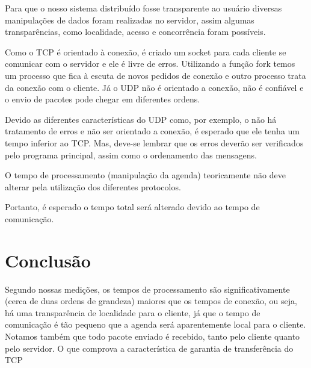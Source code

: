 \documentclass[10pt,a4paper]{article}
\begin{document}
Para que o nosso sistema distribuído fosse transparente ao usuário
diversas manipulações de dados foram realizadas no servidor, assim
algumas transparências, como localidade, acesso e concorrência foram
possíveis.

Como o TCP é orientado à conexão, é criado um socket para cada cliente
se comunicar com o servidor e ele é livre de erros. Utilizando a função fork temos um
processo que fica à escuta de novos pedidos de conexão e outro
processo trata da conexão com o cliente. 
Já o UDP não é orientado a
conexão, não é confiável e o envio de pacotes pode chegar em diferentes ordens.


Devido as diferentes características do UDP como, por exemplo, o não há tratamento de
erros e  não ser orientado a conexão, é esperado que ele tenha
um tempo inferior ao TCP. Mas, deve-se lembrar que os erros deverão
ser verificados pelo programa principal, assim como o ordenamento das mensagens.

O tempo de processamento (manipulação da agenda) teoricamente não deve
alterar pela utilização dos diferentes protocolos.

Portanto, é esperado o tempo total será alterado devido ao tempo de comunicação.
\newpage
\section{Conclusão}
Segundo nossas medições, os tempos de processamento são significativamente (cerca de duas ordens de grandeza) maiores que os tempos de conexão, ou seja, há uma transparência de localidade para o cliente, já que o tempo de comunicação é tão pequeno que a agenda será aparentemente local para o cliente.
Notamos também que todo pacote enviado é recebido, tanto pelo cliente quanto pelo servidor. O que comprova a característica de garantia de transferência do TCP


\begin{small}
  
\end{small}
\end{document}
